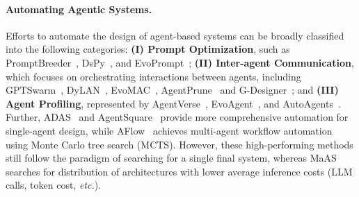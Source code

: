 \documentclass{article}
\theoremstyle{plain}
\theoremstyle{definition}
\theoremstyle{remark}
\newcommand{\ourmethod}{{{MaAS}}\xspace}
\begin{document}
\paragraph{Automating Agentic Systems.}
Efforts to automate the design of agent-based systems can be broadly classified into the following categories: \textbf{(I) Prompt Optimization}, such as PromptBreeder~\citep{fernando2023promptbreeder}, DsPy~\citep{khattab2023dspy}, and EvoPrompt~\citep{guo2023evoprompt}; \textbf{(II) Inter-agent Communication}, which focuses on orchestrating interactions between agents, including GPTSwarm~\citep{zhuge2024gptswarm}, DyLAN~\citep{arXiv2023_Dynamic-LLM-Agent}, EvoMAC~\citep{hu2024evomac}, AgentPrune~\citep{zhang2024cut} and G-Designer~\citep{zhang2024gdesigner}; and \textbf{(III) Agent Profiling}, represented by AgentVerse~\citep{chen2023agentverse}, EvoAgent~\citep{yuan2024evoagent}, and AutoAgents~\citep{chen2023autoagents}. 
Further, ADAS~\citep{hu2024adas} and AgentSquare~\citep{shang2024agentsquare} provide more comprehensive automation for single-agent design, while AFlow~\citep{zhang2024aflow} achieves multi-agent workflow automation using Monte Carlo tree search (MCTS). However, these high-performing methods still follow the paradigm of searching for a single final system, whereas \ourmethod searches for distribution of architectures with lower average inference costs (LLM calls, token cost, \textit{etc.}).

\end{document}
